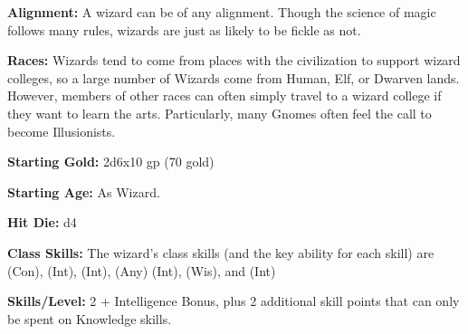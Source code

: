 
\textbf{Alignment:} A wizard can be of any alignment. Though the science of magic follows many rules, wizards are just as likely to be fickle as not.

\textbf{Races:} Wizards tend to come from places with the civilization to support wizard colleges, so a large number of Wizards come from Human, Elf, or Dwarven lands. However, members of other races can often simply travel to a wizard college if they want to learn the arts. Particularly, many Gnomes often feel the call to become Illusionists.

\textbf{Starting Gold:} 2d6x10 gp (70 gold)

\textbf{Starting Age:} As Wizard.

\textbf{Hit Die:} d4

\textbf{Class Skills:} The wizard's class skills (and the key ability for each skill) are  (Con),  (Int),  (Int),  (Any) (Int),  (Wis), and  (Int)

\textbf{Skills/Level:} 2 + Intelligence Bonus, plus 2 additional skill points that can only be spent on Knowledge skills.

\poorbab{}
\poorfor{}
\poorref{}
\goodwil{}

\begin{fullcastingclasstable}
\end{fullcastingclasstable}

